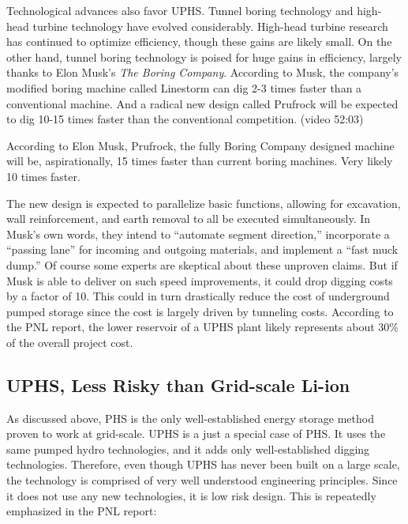 \documentclass[hidelinks,12pt,a4paper]{article}
\begin{document}
Technological advances also favor UPHS. Tunnel boring technology and high-head turbine technology have evolved considerably. High-head turbine research has continued to optimize efficiency, though these gains are likely small. On the other hand, tunnel boring technology is poised for huge gains in efficiency, largely thanks to Elon Musk's \textit{The Boring Company}. According to Musk, the company's modified boring machine called Linestorm can dig 2-3 times faster than a conventional machine. And a radical new design called Prufrock will be expected to dig 10-15 times faster than the conventional competition.  \cite{TheBoringCompanyInformationSession} (video 52:03)

\begin{displayquote}
According to Elon Musk, Prufrock, the fully Boring Company designed machine will be, aspirationally, 15 times faster than current boring machines. Very likely 10 times faster.
\end{displayquote}

The new design is expected to parallelize basic functions, allowing for excavation, wall reinforcement, and earth removal to all be executed simultaneously. In Musk's own words, they intend to “automate segment direction,” incorporate a “passing lane” for incoming and outgoing materials, and implement a  “fast muck dump.” Of course some experts are skeptical about these unproven claims. \cite{ElonMuskTunnelingTechUnderLA} But if Musk is able to deliver on such speed improvements, it could drop digging costs by a factor of 10. This could in turn drastically reduce the cost of underground pumped storage since the cost is largely driven by tunneling costs. According to the PNL report, the lower reservoir of a UPHS plant likely represents about 30\% of the overall project cost. \cite{UndergroundPumpedHydroelectricStorage}

\subsection{UPHS, Less Risky than Grid-scale Li-ion}
As discussed above, PHS is the only well-established energy storage method proven to work at grid-scale. UPHS is a just a special case of PHS. It uses the same pumped hydro technologies, and it adds only well-established digging technologies. Therefore, even though UPHS has never been built on a large scale, the technology is comprised of very well understood engineering principles. Since it does not use any new technologies, it is low risk design. This is repeatedly emphasized in the PNL report:
\end{document}
